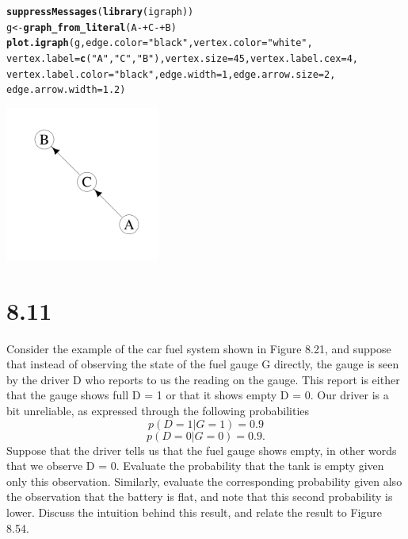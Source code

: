 \documentclass[11pt, oneside]{article}\usepackage[]{graphicx}\usepackage[]{color}
\makeatletter
\newcommand{\hlnum}[1]{\textcolor[rgb]{0.686,0.059,0.569}{#1}}%
\newcommand{\hlstr}[1]{\textcolor[rgb]{0.192,0.494,0.8}{#1}}%
\newcommand{\hlopt}[1]{\textcolor[rgb]{0,0,0}{#1}}%
\newcommand{\hlstd}[1]{\textcolor[rgb]{0.345,0.345,0.345}{#1}}%
\newcommand{\hlkwb}[1]{\textcolor[rgb]{0.69,0.353,0.396}{#1}}%
\newcommand{\hlkwc}[1]{\textcolor[rgb]{0.333,0.667,0.333}{#1}}%
\newcommand{\hlkwd}[1]{\textcolor[rgb]{0.737,0.353,0.396}{\textbf{#1}}}%
\newenvironment{kframe}{%
 \def\at@end@of@kframe{}%
 \ifinner\ifhmode%
  \def\at@end@of@kframe{\end{minipage}}%
  \begin{minipage}{\columnwidth}%
 \fi\fi%
 \def\FrameCommand##1{\hskip\@totalleftmargin \hskip-\fboxsep
 \colorbox{shadecolor}{##1}\hskip-\fboxsep
     \hskip-\linewidth \hskip-\@totalleftmargin \hskip\columnwidth}%
 \MakeFramed {\advance\hsize-\width
   \@totalleftmargin\z@ \linewidth\hsize
   \@setminipage}}%
 {\par\unskip\endMakeFramed%
 \at@end@of@kframe}
\newenvironment{knitrout}{}{} %
\makeatother
\begin{document}
\begin{knitrout}
\color{fgcolor}\begin{kframe}
\begin{alltt}
\hlkwd{suppressMessages}\hlstd{(}\hlkwd{library}\hlstd{(igraph))}
\hlstd{g} \hlkwb{<-} \hlkwd{graph_from_literal}\hlstd{(A}\hlopt{-+}\hlstd{C}\hlopt{-+}\hlstd{B)}
\hlkwd{plot.igraph}\hlstd{(g,} \hlkwc{edge.color} \hlstd{=} \hlstr{"black"}\hlstd{,} \hlkwc{vertex.color} \hlstd{=} \hlstr{"white"}\hlstd{,}
            \hlkwc{vertex.label} \hlstd{=} \hlkwd{c}\hlstd{(}\hlstr{"A"}\hlstd{,}\hlstr{"C"}\hlstd{,}\hlstr{"B"}\hlstd{),} \hlkwc{vertex.size} \hlstd{=} \hlnum{45}\hlstd{,} \hlkwc{vertex.label.cex} \hlstd{=} \hlnum{4}\hlstd{,}
            \hlkwc{vertex.label.color} \hlstd{=} \hlstr{"black"}\hlstd{,} \hlkwc{edge.width} \hlstd{=} \hlnum{1}\hlstd{,} \hlkwc{edge.arrow.size} \hlstd{=} \hlnum{2}\hlstd{,}
            \hlkwc{edge.arrow.width} \hlstd{=} \hlnum{1.2}\hlstd{)}
\end{alltt}
\end{kframe}
\includegraphics[width=2in]{figure/unnamed-chunk-1-1} 

\end{knitrout}

\section*{8.11}
Consider the example of the car fuel system shown in Figure 8.21, and suppose
that instead of observing the state of the fuel gauge G directly, the gauge is seen by
the driver D who reports to us the reading on the gauge. This report is either that the
gauge shows full D = 1 or that it shows empty D = 0. Our driver is a bit unreliable,
as expressed through the following probabilities
$$p(D = 1|G = 1) = 0.9$$
$$p(D = 0|G = 0) = 0.9.$$
Suppose that the driver tells us that the fuel gauge shows empty, in other words
that we observe D = 0. Evaluate the probability that the tank is empty given only
this observation. Similarly, evaluate the corresponding probability given also the
observation that the battery is flat, and note that this second probability is lower.
Discuss the intuition behind this result, and relate the result to Figure 8.54.
\end{document}
